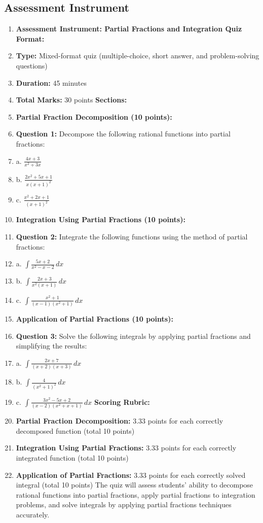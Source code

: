 \subsection{Assessment Instrument}

\begin{enumerate}
    \item \textbf{Assessment Instrument: Partial Fractions and Integration Quiz} \textbf{Format:}
    \item \textbf{Type:} Mixed-format quiz (multiple-choice, short answer, and problem-solving questions)
    \item \textbf{Duration:} 45 minutes
    \item \textbf{Total Marks:} 30 points \textbf{Sections:}
    \item \textbf{Partial Fraction Decomposition (10 points):}
    \item \textbf{Question 1:} Decompose the following rational functions into partial fractions:
    \item a. $\frac{4x + 3}{x^2 + 3x}$
    \item b. $\frac{2x^2 + 5x + 1}{x(x+1)^2}$
    \item c. $\frac{x^2 + 2x + 1}{(x+1)^2}$
    \item \textbf{Integration Using Partial Fractions (10 points):}
    \item \textbf{Question 2:} Integrate the following functions using the method of partial fractions:
    \item a. $\int \frac{5x + 2}{x^2 - x - 2} \, dx$
    \item b. $\int \frac{2x + 3}{x^2(x+1)} \, dx$
    \item c. $\int \frac{x^2 + 1}{(x-1)(x^2 + 1)} \, dx$
    \item \textbf{Application of Partial Fractions (10 points):}
    \item \textbf{Question 3:} Solve the following integrals by applying partial fractions and simplifying the results:
    \item a. $\int \frac{2x + 7}{(x+2)(x+3)} \, dx$
    \item b. $\int \frac{4}{(x^2 + 1)^2} \, dx$
    \item c. $\int \frac{3x^2 - 5x + 2}{(x - 2)(x^2 + x + 1)} \, dx$ \textbf{Scoring Rubric:}
    \item \textbf{Partial Fraction Decomposition:} 3.33 points for each correctly decomposed function (total 10 points)
    \item \textbf{Integration Using Partial Fractions:} 3.33 points for each correctly integrated function (total 10 points)
    \item \textbf{Application of Partial Fractions:} 3.33 points for each correctly solved integral (total 10 points) The quiz will assess students' ability to decompose rational functions into partial fractions, apply partial fractions to integration problems, and solve integrals by applying partial fractions techniques accurately.
\end{enumerate}

